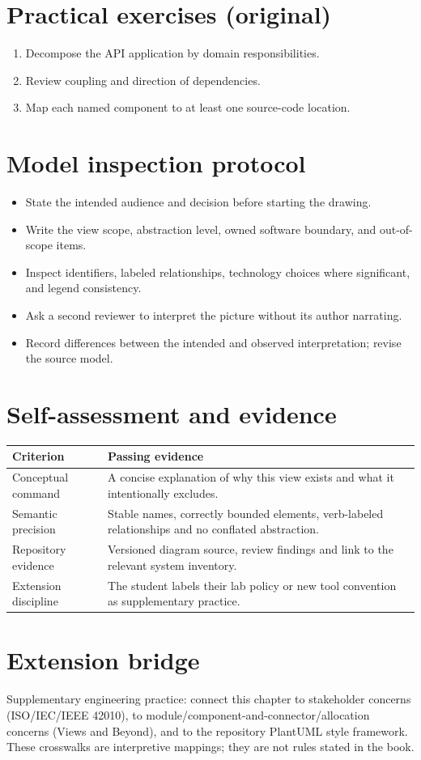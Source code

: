 \documentclass[10pt,letterpaper]{article}
\begin{document}
\section{Practical exercises (original)}
\begin{enumerate}
\item Decompose the API application by domain responsibilities.
\item Review coupling and direction of dependencies.
\item Map each named component to at least one source-code location.
\end{enumerate}

\section{Model inspection protocol}
\begin{itemize}
\item State the intended audience and decision before starting the drawing.
\item Write the view scope, abstraction level, owned software boundary, and out-of-scope items.
\item Inspect identifiers, labeled relationships, technology choices where significant, and legend consistency.
\item Ask a second reviewer to interpret the picture without its author narrating.
\item Record differences between the intended and observed interpretation; revise the source model.
\end{itemize}

\section{Self-assessment and evidence}
\begin{tabularx}{\linewidth}{@{}YY@{}}\toprule
\textbf{Criterion} & \textbf{Passing evidence} \\ \midrule
Conceptual command & A concise explanation of why this view exists and what it intentionally excludes. \\
Semantic precision & Stable names, correctly bounded elements, verb-labeled relationships and no conflated abstraction. \\
Repository evidence & Versioned diagram source, review findings and link to the relevant system inventory. \\
Extension discipline & The student labels their lab policy or new tool convention as supplementary practice. \\
\bottomrule\end{tabularx}


\section{Extension bridge}
Supplementary engineering practice: connect this chapter to stakeholder concerns (ISO/IEC/IEEE 42010), to module/component-and-connector/allocation concerns (Views and Beyond), and to the repository PlantUML style framework. These crosswalks are interpretive mappings; they are not rules stated in the book.
\end{document}
